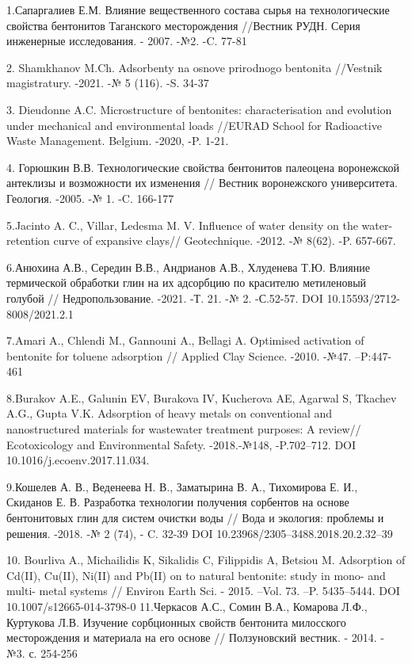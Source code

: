 \begin{noparindent}
1.Сапаргалиев Е.М. Влияние вещественного состава сырья на
технологические свойства бентонитов Таганского месторождения //Вестник
РУДН. Серия инженерные исследования. - 2007. -№2. -C. 77-81

2. Shamkhanov M.Ch. Adsorbenty na osnove prirodnogo bentonita //Vestnik
magistratury. -2021. -№ 5 (116). -S. 34-37

3. Dieudonne A.C. Microstructure of bentonites: characterisation and
evolution under mechanical and environmental loads //EURAD School for
Radioactive Waste Management. Belgium. -2020, -P. 1-21.

4. Горюшкин В.В. Технологические свойства бентонитов палеоцена
воронежской антеклизы и возможности их изменения // Вестник воронежского
университета. Геология. -2005. -№ 1. -C. 166-177

5.Jacinto A. C., Villar, Ledesma M. V. Influence of water density on the
water-retention curve of expansive clays// Geotechnique. -2012. -№
8(62). -P. 657-667.

6.Анюхина А.В., Середин В.В., Андрианов А.В., Хлуденева Т.Ю. Влияние
термической обработки глин на их адсорбцию по красителю метиленовый
голубой // Недропользование. -2021. -Т. 21. -№ 2. -С.52-57. DOI
10.15593/2712-8008/2021.2.1

7.Amari A., Chlendi M., Gannouni A., Bellagi A. Optimised activation of
bentonite for toluene adsorption // Applied Clay Science. -2010. -№47.
--P:447-461

8.Burakov A.E., Galunin EV, Burakova IV, Kucherova AE, Agarwal S,
Tkachev A.G., Gupta V.K. Adsorption of heavy metals on conventional and
nanostructured materials for wastewater treatment purposes: A review//
Ecotoxicology and Environmental Safety. -2018.-№148, -P.702--712. DOI
10.1016/j.ecoenv.2017.11.034.

9.Кошелев А. В., Веденеева Н. В., Заматырина В. А., Тихомирова Е. И.,
Скиданов Е. В. Разработка технологии получения сорбентов на основе
бентонитовых глин для систем очистки воды // Вода и экология: проблемы и
решения. -2018. -№ 2 (74), - C. 32-39 DOI
10.23968/2305--3488.2018.20.2.32--39

10. Bourliva A., Michailidis K, Sikalidis C, Filippidis A, Betsiou M.
Adsorption of Cd(II), Cu(II), Ni(II) and Pb(II) on to natural bentonite:
study in mono- and multi- metal systems // Environ Earth Sci. - 2015.
--Vol. 73. --P. 5435--5444. DOI 10.1007/s12665-014-3798-0 11.Черкасов
А.С., Сомин В.А., Комарова Л.Ф., Куртукова Л.В. Изучение сорбционных
свойств бентонита милосского месторождения и материала на его основе //
Ползуновский вестник. - 2014. - №3. с. 254-256
\end{noparindent}

